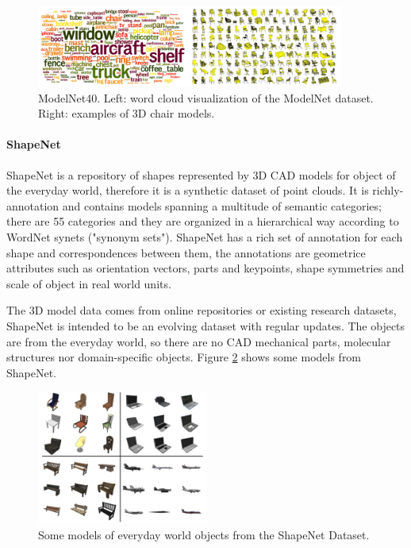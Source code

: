 \begin{figure}[ht]
    \centering
    \includegraphics[width=0.9\textwidth]{images/modelnet.png}
    \caption{ModelNet40. Left: word cloud visualization of the ModelNet dataset. Right: examples of 3D chair models.}
    \label{fig:modelnet}
\end{figure}

\paragraph{ShapeNet~\cite{chang2015shapenet}}

ShapeNet is a repository of shapes represented by 3D CAD models for object of the everyday world, therefore it is a synthetic dataset of point clouds. It is richly-annotation and contains models spanning a multitude of semantic categories; there are 55 categories and they are organized in a hierarchical way according to WordNet synets ("synonym sets"). ShapeNet has a rich set of annotation for each shape and correspondences between them, the annotations are geometrice attributes such as orientation vectors, parts and keypoints, shape symmetries and scale of object in real world units.

The 3D model data comes from online repositories or existing research datasets, ShapeNet is intended to be an evolving dataset with regular updates. The objects are from the everyday world, so there are no CAD mechanical parts, molecular structures nor domain-specific objects. Figure \ref{fig:shapenet} shows some models from ShapeNet.

\begin{figure}[ht]
    \centering
    \includegraphics[width=0.5\textwidth]{images/shapenet.png}
    \caption{Some models of everyday world objects from the ShapeNet Dataset.}
    \label{fig:shapenet}
\end{figure}

